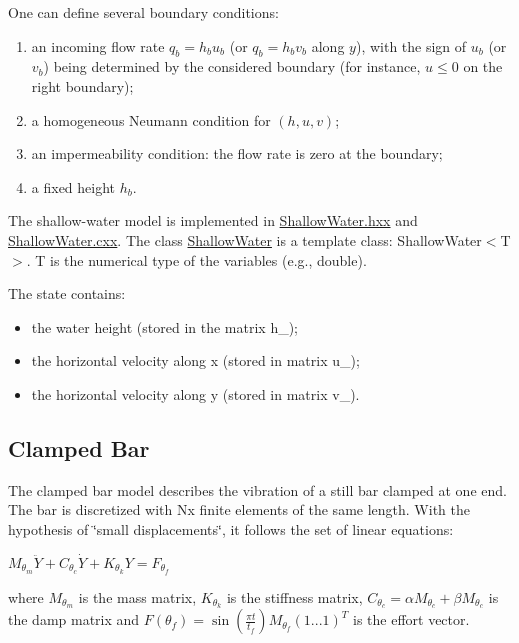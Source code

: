 \documentclass{tufte-book}
\begin{document}
One can define several boundary conditions:
\begin{enumerate}
\item an incoming flow rate $q_b = h_bu_b$ (or $q_b = h_bv_b$ along $y$), with the sign of $u_b$ (or $v_b$) being determined by the considered boundary (for instance, $u \le 0$ on the right boundary);
\item a homogeneous Neumann condition for $(h, u, v)$;
\item an impermeability condition: the flow rate is zero at the boundary;
\item a fixed height $h_b$.
\end{enumerate}

The shallow-\/water model is implemented in {\ttfamily \hyperlink{_shallow_water_8hxx_source}{ShallowWater.hxx}} and {\ttfamily \hyperlink{_shallow_water_8cxx_source}{ShallowWater.cxx}}. The class {\ttfamily  \hyperlink{class_verdandi_1_1_shallow_water}{ShallowWater}} is a template class: {\ttfamily ShallowWater$<$T$>$}. {\ttfamily T} is the numerical type of the variables (e.g., {\ttfamily double}).

The state contains:
\begin{itemize}
\item the water height (stored in the matrix {\ttfamily h\_\-});
\item the horizontal velocity along x (stored in matrix {\ttfamily u\_\-});
\item the horizontal velocity along y (stored in matrix {\ttfamily v\_\-}).
\end{itemize}


\hypertarget{clamped_bar}{}\subsection{Clamped Bar}\label{clamped_bar}

The clamped bar model describes the vibration of a still bar clamped at one end. The bar is discretized with {\ttfamily Nx} finite elements of the same length. With the hypothesis of \char`\"{}small displacements\char`\"{}, it follows the set of linear equations:

\begin{center} $ M_{\theta_m} \ddot Y + C_{\theta_c} \dot Y + K_{\theta_k} Y = F_{\theta_f}$ \par
 \end{center}

where $M_{\theta_m}$ is the mass matrix, $K_{\theta_k}$ is the stiffness matrix, $C_{\theta_c} = \alpha M_{\theta_c} + \beta M_{\theta_c} $ is the damp matrix and $F(\theta_f) = \sin(\frac{\pi t}{t_f}) M_{\theta_f} (1 ... 1)^T$ is the effort vector.
\end{document}
